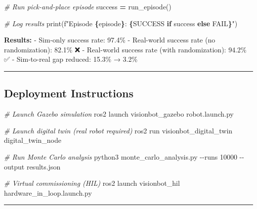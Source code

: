 \documentclass[
]{article}
\newenvironment{Shaded}{\begin{snugshade}}{\end{snugshade}}
\newcommand{\AttributeTok}[1]{\textcolor[rgb]{0.13,0.29,0.53}{#1}}
\newcommand{\BuiltInTok}[1]{#1}
\newcommand{\CommentTok}[1]{\textcolor[rgb]{0.56,0.35,0.01}{\textit{#1}}}
\newcommand{\ControlFlowTok}[1]{\textcolor[rgb]{0.13,0.29,0.53}{\textbf{#1}}}
\newcommand{\ExtensionTok}[1]{#1}
\newcommand{\NormalTok}[1]{#1}
\newcommand{\OperatorTok}[1]{\textcolor[rgb]{0.81,0.36,0.00}{\textbf{#1}}}
\newcommand{\SpecialCharTok}[1]{\textcolor[rgb]{0.81,0.36,0.00}{\textbf{#1}}}
\newcommand{\SpecialStringTok}[1]{\textcolor[rgb]{0.31,0.60,0.02}{#1}}
\newcommand{\StringTok}[1]{\textcolor[rgb]{0.31,0.60,0.02}{#1}}
\begin{document}
\begin{Shaded}
\begin{Highlighting}[]
    \CommentTok{\# Run pick{-}and{-}place episode}
\NormalTok{    success }\OperatorTok{=}\NormalTok{ run\_episode()}

    \CommentTok{\# Log results}
    \BuiltInTok{print}\NormalTok{(}\SpecialStringTok{f"Episode }\SpecialCharTok{\{}\NormalTok{episode}\SpecialCharTok{\}}\SpecialStringTok{: }\SpecialCharTok{\{}\StringTok{\textquotesingle{}SUCCESS\textquotesingle{}} \ControlFlowTok{if}\NormalTok{ success }\ControlFlowTok{else} \StringTok{\textquotesingle{}FAIL\textquotesingle{}}\SpecialCharTok{\}}\SpecialStringTok{"}\NormalTok{)}
\end{Highlighting}
\end{Shaded}

\textbf{Results:} - Sim-only success rate: 97.4\% - Real-world success
rate (no randomization): 82.1\% ❌ - Real-world success rate (with
randomization): 94.2\% ✅ - Sim-to-real gap reduced: 15.3\% → 3.2\%

\begin{center}\rule{0.5\linewidth}{0.5pt}\end{center}

\hypertarget{deployment-instructions}{%
\subsection{Deployment Instructions}\label{deployment-instructions}}

\begin{Shaded}
\begin{Highlighting}[]
\CommentTok{\# Launch Gazebo simulation}
\ExtensionTok{ros2}\NormalTok{ launch visionbot\_gazebo robot.launch.py}

\CommentTok{\# Launch digital twin (real robot required)}
\ExtensionTok{ros2}\NormalTok{ run visionbot\_digital\_twin digital\_twin\_node}

\CommentTok{\# Run Monte Carlo analysis}
\ExtensionTok{python3}\NormalTok{ monte\_carlo\_analysis.py }\AttributeTok{{-}{-}runs}\NormalTok{ 10000 }\AttributeTok{{-}{-}output}\NormalTok{ results.json}

\CommentTok{\# Virtual commissioning (HIL)}
\ExtensionTok{ros2}\NormalTok{ launch visionbot\_hil hardware\_in\_loop.launch.py}
\end{Highlighting}
\end{Shaded}

\begin{center}\rule{0.5\linewidth}{0.5pt}\end{center}
\end{document}
